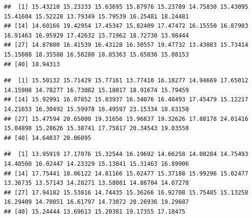 \documentclass[
  12pt,
]{book}
\newenvironment{Shaded}{\begin{snugshade}}{\end{snugshade}}
\newcommand{\DecValTok}[1]{\textcolor[rgb]{0.00,0.00,0.81}{#1}}
\newcommand{\DocumentationTok}[1]{\textcolor[rgb]{0.56,0.35,0.01}{\textbf{\textit{#1}}}}
\newcommand{\NormalTok}[1]{#1}
\newcommand{\SpecialCharTok}[1]{\textcolor[rgb]{0.00,0.00,0.00}{#1}}
\begin{document}
\begin{verbatim}
##  [1] 15.43210 15.23333 15.63695 15.87976 15.23789 14.75830 15.43095 15.41604 15.52228 13.79349 15.79539 16.25481 18.24481
## [14] 14.60166 19.42954 17.45347 15.82409 17.47472 16.15550 16.87903 16.91463 16.95929 17.42632 15.71962 18.72730 13.98444
## [27] 14.87800 16.41539 16.43128 16.30557 19.47732 13.43083 15.73414 15.15088 18.35588 16.50280 18.85363 15.65036 15.08153
## [40] 18.94313
\end{verbatim}

\begin{Shaded}
\end{Shaded}

\begin{verbatim}
##  [1] 15.50132 15.71429 15.77161 13.77410 16.10277 14.94669 17.65012 14.15908 14.78277 16.73082 15.18017 18.91674 15.79459
## [14] 15.92991 16.07852 15.83937 16.34076 16.48493 17.45479 15.12217 14.21653 16.30492 15.59978 16.49597 23.15334 18.63150
## [27] 15.47594 20.65000 19.31656 15.96837 19.32626 17.88178 24.01416 15.04898 15.28626 15.38741 17.75817 20.34543 19.03550
## [40] 14.64837 20.06095
\end{verbatim}

\begin{Shaded}
\end{Shaded}

\begin{verbatim}
##  [1] 13.95919 17.17076 15.32544 16.19692 14.66258 14.08284 14.75493 14.48560 16.02447 14.23329 15.13841 15.31463 16.89906
## [14] 17.75441 18.06122 14.81166 15.02477 15.37188 15.99296 15.02477 13.36735 13.57143 14.28271 13.58081 14.88704 14.67278
## [27] 17.94182 15.53816 14.74435 15.36266 16.92708 15.75485 15.13258 16.29409 14.70051 16.61797 14.73072 20.26936 19.29687
## [40] 15.24444 13.69613 15.20381 19.17355 17.18475
\end{verbatim}
\end{document}
